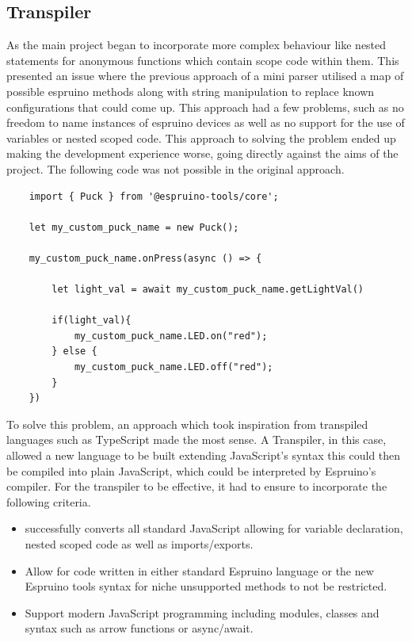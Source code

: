 \documentclass{l4proj}
\begin{document}
\subsection{Transpiler}
As the main project began to incorporate more complex behaviour like nested statements for anonymous functions which contain scope code within them. This presented an issue where the previous approach of a mini parser utilised a map of possible espruino methods along with string manipulation to replace known configurations that could come up. This approach had a few problems, such as no freedom to name instances of espruino devices as well as no support for the use of variables or nested scoped code. This approach to solving the problem ended up making the development experience worse, going directly against the aims of the project. The following code was not possible in the original approach.

\begin{lstlisting}
    import { Puck } from '@espruino-tools/core';

    let my_custom_puck_name = new Puck();
    
    my_custom_puck_name.onPress(async () => {
    
        let light_val = await my_custom_puck_name.getLightVal()
        
        if(light_val){
            my_custom_puck_name.LED.on("red");
        } else {
            my_custom_puck_name.LED.off("red");
        }
    })
\end{lstlisting}

To solve this problem, an approach which took inspiration from transpiled languages such as TypeScript made the most sense. A Transpiler, in this case, allowed a new language to be built extending JavaScript's syntax this could then be compiled into plain JavaScript, which could be interpreted by Espruino's compiler. For the transpiler to be effective, it had to ensure to incorporate the following criteria.
\\
\begin{itemize}
    \item successfully converts all standard JavaScript allowing for variable declaration, nested scoped code as well as imports/exports.
    \item Allow for code written in either standard Espruino language or the new Espruino tools syntax for niche unsupported methods to not be restricted.
    \item Support modern JavaScript programming including modules, classes and syntax such as arrow functions or async/await.
\end{itemize}
\end{document}

